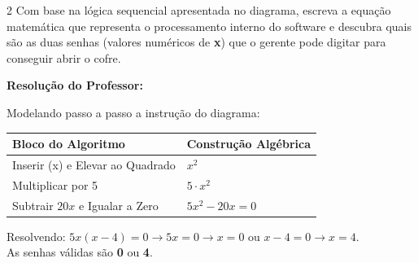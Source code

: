 \begin{multicols*}{2}
Com base na lógica sequencial apresentada no diagrama, escreva a equação matemática que representa o processamento interno do software e descubra quais são as duas senhas (valores numéricos de \textbf{x}) que o gerente pode digitar para conseguir abrir o cofre.

\ifgabarito
    \begin{tcolorbox}[colback=CorTitUm!5, colframe=CorTitUm, boxrule=1pt, arc=4pt, left=6pt, right=6pt, top=6pt, bottom=6pt]
    \small\textbf{\textcolor{CorTitUm}{Resolução do Professor:}}\par\vspace{0.1cm}
    \color{CinzaEscuro}
    Modelando passo a passo a instrução do diagrama:
    \vspace{0.1cm}
    \begin{center}
    \begin{tabular}{|l|l|}
    \hline
    \textbf{Bloco do Algoritmo} & \textbf{Construção Algébrica} \\
    \hline
    Inserir (x) e Elevar ao Quadrado & $x^2$ \\
    \hline
    Multiplicar por 5 & $5 \cdot x^2$ \\
    \hline
    Subtrair $20x$ e Igualar a Zero & $5x^2 - 20x = 0$ \\
    \hline
    \end{tabular}
    \end{center}
    \vspace{0.1cm}
    Resolvendo: $5x(x - 4) = 0 \rightarrow 5x=0 \rightarrow x=0$ ou $x-4=0 \rightarrow x=4$.\\
    As senhas válidas são \textbf{0} ou \textbf{4}.
    \end{tcolorbox}
\fi

\par\vspace{\espacoQuestao}

\end{multicols*}
